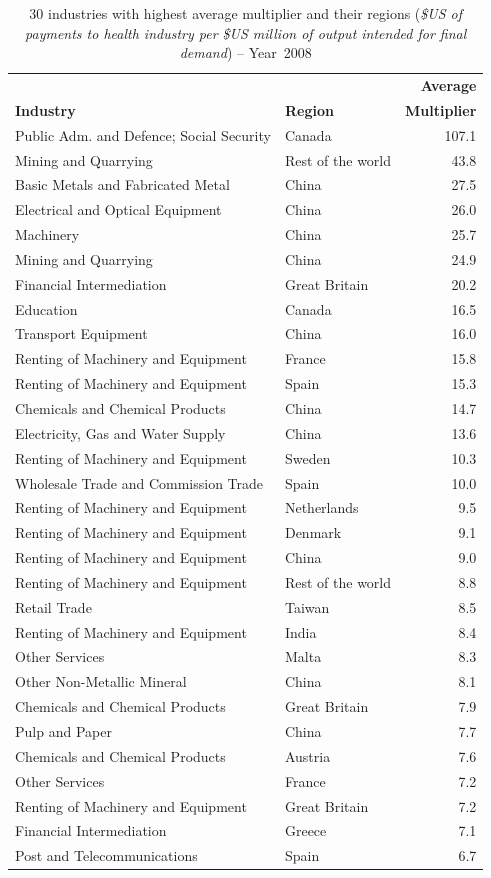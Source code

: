 \documentclass[a4paper,12pt]{article}
\begin{document}
\begin{table} %
\caption{30 industries with highest average multiplier and their regions (\textit{\$US of payments to health industry per \$US million of output intended for final demand}) -- Year~2008} 
\begin{center}
\small \begin{tabular}{llr}
  &  & \textbf{Average}\\ 
 \textbf{Industry} & \textbf{Region} & \textbf{Multiplier}\\ 
 \hline
Public Adm. and Defence; Social Security & Canada & 107.1\\ 
Mining and Quarrying & Rest of the world & 43.8\\ 
Basic Metals and Fabricated Metal & China & 27.5\\ 
Electrical and Optical Equipment & China & 26.0\\ 
Machinery & China & 25.7\\ 
Mining and Quarrying & China & 24.9\\ 
Financial Intermediation & Great Britain & 20.2\\ 
Education & Canada & 16.5\\ 
Transport Equipment & China & 16.0\\ 
Renting of Machinery and Equipment & France & 15.8\\ 
Renting of Machinery and Equipment & Spain & 15.3\\ 
Chemicals and Chemical Products & China & 14.7\\ 
Electricity, Gas and Water Supply & China & 13.6\\ 
Renting of Machinery and Equipment & Sweden & 10.3\\ 
Wholesale Trade and Commission Trade & Spain & 10.0\\ 
Renting of Machinery and Equipment & Netherlands & 9.5\\ 
Renting of Machinery and Equipment & Denmark & 9.1\\ 
Renting of Machinery and Equipment & China & 9.0\\ 
Renting of Machinery and Equipment & Rest of the world & 8.8\\ 
Retail Trade & Taiwan & 8.5\\ 
Renting of Machinery and Equipment & India & 8.4\\ 
Other Services & Malta & 8.3\\ 
Other Non-Metallic Mineral & China & 8.1\\ 
Chemicals and Chemical Products & Great Britain & 7.9\\ 
Pulp and Paper & China & 7.7\\ 
Chemicals and Chemical Products & Austria & 7.6\\ 
Other Services & France & 7.2\\ 
Renting of Machinery and Equipment & Great Britain & 7.2\\ 
Financial Intermediation & Greece & 7.1\\ 
Post and Telecommunications & Spain & 6.7\\ 
\hline
\end{tabular}
\label{tab01} 
\end{center}
\end{table}
\end{document}
